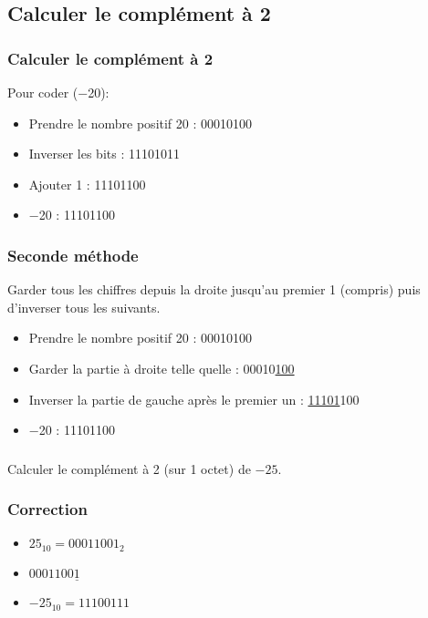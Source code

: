 \documentclass[svgnames,11pt]{beamer}
\begin{document}
\subsection{Calculer le complément à 2}
\begin{frame}
    \frametitle{Calculer le complément à 2}

    Pour coder (−20):
    \begin{itemize}
        \item Prendre le nombre positif 20 : 00010100
        \item Inverser les bits : 11101011
        \item Ajouter 1 : 11101100
        \item −20 : 11101100
    \end{itemize}

\end{frame}
\begin{frame}
    \frametitle{Seconde méthode}

    Garder tous les chiffres depuis la droite jusqu'au premier 1 (compris) puis d'inverser tous les suivants.
    \begin{itemize}
        \item Prendre le nombre positif 20 : 00010100
        \item Garder la partie à droite telle quelle : 00010\underline{100}
        \item Inverser la partie de gauche après le premier un : \underline{11101}100
        \item −20 : 11101100
    \end{itemize}
\end{frame}
\begin{frame}
    \frametitle{}

    \begin{activite}
        Calculer le complément à 2 (sur 1 octet) de $-25$.
    \end{activite}

\end{frame}
\begin{frame}
    \frametitle{Correction}
    \begin{itemize}
        \item $25_{10} = 00011001_2$
        \item $0001100\underline{1}$
        \item $-25_{10}=11100111$
    \end{itemize}


\end{frame}
\end{document}
